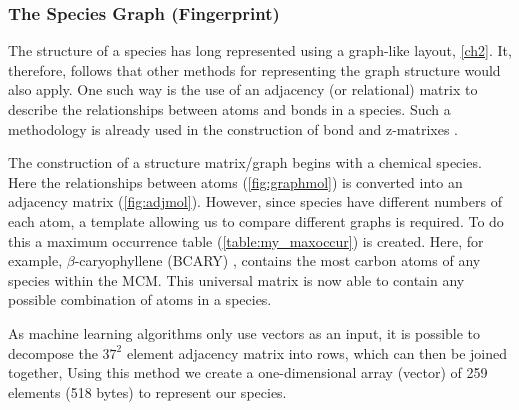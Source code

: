 \subsubsection{The Species Graph (Fingerprint)}\label{sec:specgraph}

The structure of a species has long represented using a graph-like layout, \autoref{ch2}. It, therefore, follows that other methods for representing the graph structure would also apply. One such way is the use of an adjacency (or relational) matrix to describe the relationships between atoms and bonds in a species. Such a methodology is already used in the construction of bond and z-matrixes \citep{mcmgen,zmatrix}.

The construction of a structure matrix/graph begins with a chemical species. Here the relationships between atoms (\autoref{fig:graphmol}) is converted into an adjacency matrix (\autoref{fig:adjmol}). However, since species have different numbers of each atom, a template allowing us to compare different graphs is required. To do this a maximum occurrence table (\autoref{table:my_maxoccur}) is created. Here, for example, $\beta$-caryophyllene (BCARY) , contains the most carbon atoms of any species within the MCM. This universal matrix is now able to contain any possible combination of atoms in a species.

As machine learning algorithms only use vectors as an input, it is possible to decompose the $37^2$ element adjacency matrix into rows, which can then be joined together, Using this method we create a one-dimensional array (vector) of 259 elements (518 bytes) to represent our species.


